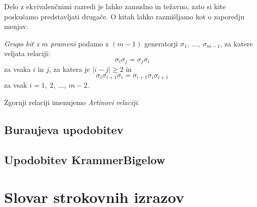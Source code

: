 \documentclass[mat1]{fmfdelo}
\begin{document}
Delo z ekvivalenčnimi razredi je lahko zamudno in težavno, zato si kite poskušamo predstavljati drugače. O kitah lahko razmišljamo kot o zaporedju menjav. 

\begin{definicija}
\emph{Grupo kit z $m$ prameni} podamo z $(m - 1)$ generatorji $\sigma_1,\ \ldots ,\ \sigma_{m - 1}$, za katere veljata relaciji: $$ \sigma_i \sigma_j = \sigma_j \sigma_i $$ za vsaka $i$ in $j$, za katera je $|i - j| \geq 2$ in $$\sigma_i \sigma_{i+1} \sigma_i = \sigma_{i+1} \sigma_i \sigma_{i+1}$$ za vsak $i = 1,\ 2,\ \ldots,\ m-2$.
\end{definicija}

\begin{opomba}
Zgornji relaciji imenujemo \emph{Artinovi relaciji}.
\end{opomba}

\subsection{Buraujeva upodobitev}

\subsection{Upodobitev Krammer\-Bigelow}





\section*{Slovar strokovnih izrazov}






\begin{thebibliography}{99}

\end{thebibliography}
\end{document}
